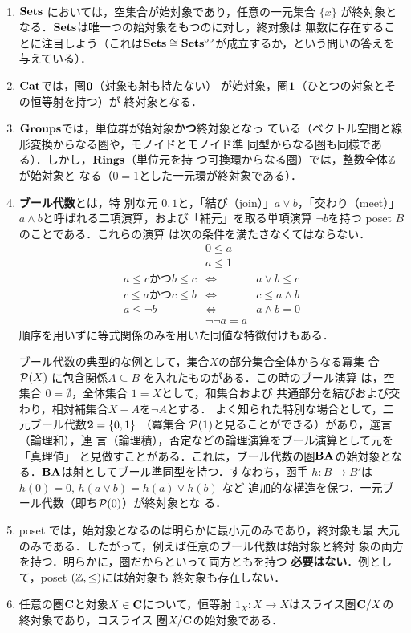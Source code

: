 \begin{example}　

 \begin{enumerate}
  \item $\mathbf{Sets}$ においては，空集合が始対象であり，任意の一元集合 $\{x\}$
	が終対象となる．$\mathbf{Sets}$は唯一つの始対象をもつのに対し，終対象は
	無数に存在することに注目しよう（これは$\mathbf{Sets} \cong \mathbf{Sets}^{\rm
	op}$が成立するか，という問いの答えを与えている）．
  \item $\mathbf{Cat}$では，圏${\bf 0}$（対象も射も持たない）
	が始対象，圏${\bf	1}$（ひとつの対象とその恒等射を持つ）が
	終対象となる．
  \item ${\bf Groups}$では，単位群が始対象{\bfseries かつ}終対象となっ
	ている（ベクトル空間と線形変換からなる圏や，モノイドとモノイド準
	同型からなる圏も同様である）．しかし，${\bf Rings}$（単位元を持
	つ可換環からなる圏）では，整数全体$\mathbb{Z}$が始対象と
	なる（$0 = 1$とした一元環が終対象である）．
  \item {\bfseries ブール代数}とは，特
	別な元 $0, 1$と，「結び（join）」$a \vee b$，「交わり（meet）」
	$a \wedge b$と呼ばれる二項演算，および「補元」を取る単項演算
	$\neg b$を持つ poset $B$ のことである．これらの演算
	は次の条件を満たさなくてはならない．
	\begin{eqnarray*}
	 &0 \leq a&\\
	 &a \leq 1&\\
	 a \leq c \text{かつ} b \leq c &\iff& a \vee b \leq c\\
	 c \leq a \text{かつ} c \leq b &\iff& c \leq a \wedge b\\
	 a \leq \neg b  &\iff& a \wedge b = 0\\
	 &\neg \neg a = a&
	\end{eqnarray*}
	順序を用いずに等式関係のみを用いた同値な特徴付けもある．

	ブール代数の典型的な例として，集合$X$の部分集合全体からなる冪集
	合$\mathcal{P}(X)$
	に包含関係$A \subseteq B$ を入れたものがある．この時のブール演算
	は，空集合 $0 = \emptyset$，全体集合 $1 = X$として，和集合および
	共通部分を結びおよび交わり，相対補集合$X - A$を$\neg A$とする．
	よく知られた特別な場合として，二元ブール代数${\bf 2} = \{0, 1\}$
	（冪集合 $\mathcal{P}(1)$と見ることができる）があり，選言（論理和），連
	言（論理積），否定などの論理演算をブール演算として元を「真理値」
	と見做すことがある．これは，ブール代数の圏${\bf BA}$の始対象とな
	る．${\bf BA}$は射としてブール準同型を持つ．すなわち，函手
	$h: B \to B'$は$h(0) = 0,\, h(a \vee b) = h(a) \vee h(b)$ など
	追加的な構造を保つ．一元ブール代数（即ち$\mathcal{P}(0)$）が終対象とな
	る．
  \item poset では，始対象となるのは明らかに最小元のみであり，終対象も最
	大元のみである．したがって，例えば任意のブール代数は始対象と終対
	象の両方を持つ．明らかに，圏だからといって両方ともを持つ
	{\bfseries 必要はない}．例として，poset $(\mathbb{Z}, \leq)$には始対象も
	終対象も存在しない．
  \item 任意の圏${\bf C}$と対象$X \in {\bf C}$について，恒等射
	$1_X: X	\to X$はスライス圏${\bf C}/X$の終対象であり，コスライス
	圏$X/{\bf C}$の始対象である．
 \end{enumerate}
\end{example}
